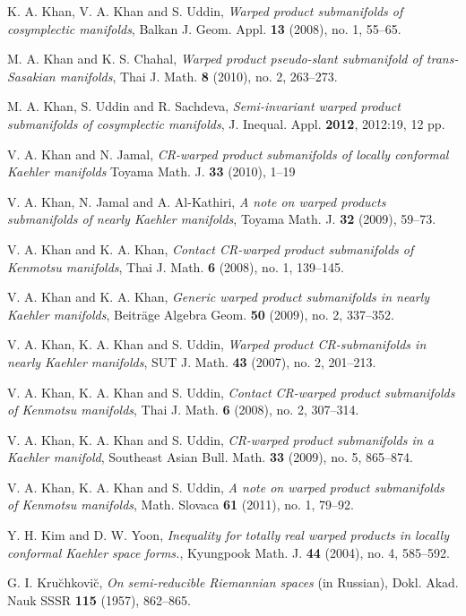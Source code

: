 \documentclass{amsart}
\theoremstyle{plain}
\numberwithin{equation}{section}
\theoremstyle{remark}
\numberwithin{equation}{section}
\begin{document}
\begin{thebibliography}{120}
 K. A. Khan, V. A. Khan and S. Uddin, {\it Warped product submanifolds of cosymplectic manifolds}, Balkan J. Geom. Appl. {\bf 13} (2008), no. 1, 55--65.

 M. A. Khan and K. S. Chahal, {\it Warped product pseudo-slant submanifold of trans-Sasakian manifolds},  Thai J. Math. {\bf 8} (2010), no. 2, 263--273.

 M. A. Khan, S. Uddin and R. Sachdeva, {\it Semi-invariant warped product submanifolds of cosymplectic manifolds},  J. Inequal. Appl. {\bf 2012}, 2012:19, 12 pp.

 V. A. Khan and N. Jamal,  {\it CR-warped product submanifolds of locally conformal Kaehler manifolds} Toyama Math. J. {\bf 33} (2010), 1--19

 V. A. Khan, N. Jamal and A. Al-Kathiri,  {\it   A note on warped products submanifolds of nearly Kaehler manifolds}, Toyama Math. J. {\bf 32} (2009), 59--73.

 V. A. Khan and K. A. Khan,  {\it  Contact CR-warped product submanifolds of Kenmotsu manifolds}, Thai J. Math. {\bf 6} (2008), no. 1, 139--145.

 V. A. Khan and K. A. Khan,  {\it  Generic warped product submanifolds in nearly Kaehler manifolds}, Beitr\"age Algebra Geom. {\bf 50} (2009), no. 2, 337--352.

 V. A. Khan, K. A. Khan and S. Uddin,  {\it Warped product CR-submanifolds in nearly Kaehler manifolds}, SUT J. Math. {\bf 43} (2007), no. 2, 201--213. 

 V. A. Khan, K. A. Khan and S. Uddin,  {\it Contact CR-warped product submanifolds of Kenmotsu manifolds}, Thai J. Math. {\bf 6} (2008), no. 2, 307--314. 

 V. A. Khan, K. A. Khan and  S. Uddin, {\it  CR-warped product submanifolds in a Kaehler manifold}, Southeast Asian Bull. Math. {\bf 33} (2009), no. 5, 865--874.

 V. A. Khan, K. A. Khan and  S. Uddin,  {\it A note on warped product submanifolds of Kenmotsu manifolds},  Math. Slovaca {\bf 61} (2011), no. 1, 79--92.

 Y. H. Kim and D. W. Yoon, {\it Inequality for totally real warped products in locally conformal Kaehler space forms.}, Kyungpook Math. J. {\bf 44} (2004), no. 4, 585--592.

 G. I. Kru\u{c}hkovi\u{c}, {\it On semi-reducible Riemannian spaces} (in Russian), Dokl. Akad. Nauk SSSR {\bf 115} (1957), 862--865.


\end{thebibliography}
\end{document}
